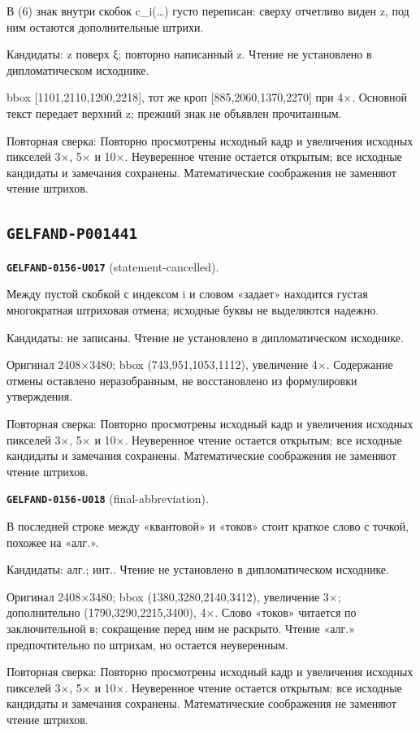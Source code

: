 В (6) знак внутри скобок c\_i(…) густо переписан: сверху отчетливо виден z, под ним остаются дополнительные штрихи.\par
Кандидаты: z поверх ξ; повторно написанный z. Чтение не установлено в дипломатическом исходнике.\par
bbox [1101,2110,1200,2218], тот же кроп [885,2060,1370,2270] при 4×. Основной текст передает верхний z; прежний знак не объявлен прочитанным.\par
Повторная сверка: Повторно просмотрены исходный кадр и увеличения исходных пикселей 3×, 5× и 10×. Неуверенное чтение остается открытым; все исходные кандидаты и замечания сохранены. Математические соображения не заменяют чтение штрихов.\par\medskip
\subsection*{\texttt{GELFAND-P001441}}
\par\noindent\leavevmode{}\label{GELFAND-0156-U017}\label{GELFAND-P001441:statement-cancelled}\textbf{\texttt{GELFAND-0156-U017}} (statement-cancelled).\nopagebreak[4]\par
Между пустой скобкой с индексом i и словом «задает» находится густая многократная штриховая отмена; исходные буквы не выделяются надежно.\par
Кандидаты: не записаны. Чтение не установлено в дипломатическом исходнике.\par
Оригинал 2408×3480; bbox (743,951,1053,1112), увеличение 4×. Содержание отмены оставлено неразобранным, не восстановлено из формулировки утверждения.\par
Повторная сверка: Повторно просмотрены исходный кадр и увеличения исходных пикселей 3×, 5× и 10×. Неуверенное чтение остается открытым; все исходные кандидаты и замечания сохранены. Математические соображения не заменяют чтение штрихов.\par\medskip
\par\noindent\leavevmode{}\label{GELFAND-0156-U018}\label{GELFAND-P001441:final-abbreviation}\textbf{\texttt{GELFAND-0156-U018}} (final-abbreviation).\nopagebreak[4]\par
В последней строке между «квантовой» и «токов» стоит краткое слово с точкой, похожее на «алг.».\par
Кандидаты: алг.; инт.. Чтение не установлено в дипломатическом исходнике.\par
Оригинал 2408×3480; bbox (1380,3280,2140,3412), увеличение 3×; дополнительно (1790,3290,2215,3400), 4×. Слово «токов» читается по заключительной в; сокращение перед ним не раскрыто. Чтение «алг.» предпочтительно по штрихам, но остается неуверенным.\par
Повторная сверка: Повторно просмотрены исходный кадр и увеличения исходных пикселей 3×, 5× и 10×. Неуверенное чтение остается открытым; все исходные кандидаты и замечания сохранены. Математические соображения не заменяют чтение штрихов.\par\medskip
